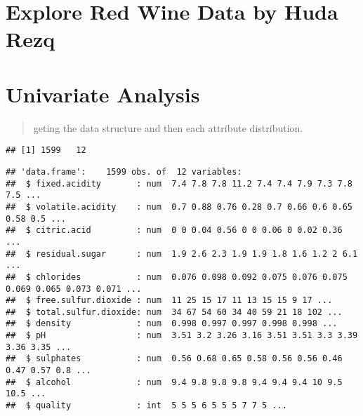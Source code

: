 \documentclass[]{article}
\title{}
\author{}
\date{}
\begin{document}
\section{Explore Red Wine Data by Huda
Rezq}\label{explore-red-wine-data-by-huda-rezq}

\section{Univariate Analysis}\label{univariate-analysis}

\begin{quote}
geting the data structure and then each attribute distribution.
\end{quote}

\begin{verbatim}
## [1] 1599   12
\end{verbatim}

\begin{verbatim}
## 'data.frame':    1599 obs. of  12 variables:
##  $ fixed.acidity       : num  7.4 7.8 7.8 11.2 7.4 7.4 7.9 7.3 7.8 7.5 ...
##  $ volatile.acidity    : num  0.7 0.88 0.76 0.28 0.7 0.66 0.6 0.65 0.58 0.5 ...
##  $ citric.acid         : num  0 0 0.04 0.56 0 0 0.06 0 0.02 0.36 ...
##  $ residual.sugar      : num  1.9 2.6 2.3 1.9 1.9 1.8 1.6 1.2 2 6.1 ...
##  $ chlorides           : num  0.076 0.098 0.092 0.075 0.076 0.075 0.069 0.065 0.073 0.071 ...
##  $ free.sulfur.dioxide : num  11 25 15 17 11 13 15 15 9 17 ...
##  $ total.sulfur.dioxide: num  34 67 54 60 34 40 59 21 18 102 ...
##  $ density             : num  0.998 0.997 0.997 0.998 0.998 ...
##  $ pH                  : num  3.51 3.2 3.26 3.16 3.51 3.51 3.3 3.39 3.36 3.35 ...
##  $ sulphates           : num  0.56 0.68 0.65 0.58 0.56 0.56 0.46 0.47 0.57 0.8 ...
##  $ alcohol             : num  9.4 9.8 9.8 9.8 9.4 9.4 9.4 10 9.5 10.5 ...
##  $ quality             : int  5 5 5 6 5 5 5 7 7 5 ...
\end{verbatim}
\end{document}
